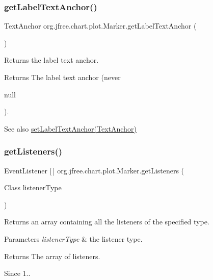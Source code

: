 \subsubsection{\texorpdfstring{get\+Label\+Text\+Anchor()}{getLabelTextAnchor()}}
{\footnotesize\ttfamily Text\+Anchor org.\+jfree.\+chart.\+plot.\+Marker.\+get\+Label\+Text\+Anchor (\begin{DoxyParamCaption}{ }\end{DoxyParamCaption})}

Returns the label text anchor.

\begin{DoxyReturn}{Returns}
The label text anchor (never
\begin{DoxyCode}
null 
\end{DoxyCode}
 ).
\end{DoxyReturn}
\begin{DoxySeeAlso}{See also}
\mbox{\hyperlink{classorg_1_1jfree_1_1chart_1_1plot_1_1_marker_a32c1fda6586338971917109d3a8684cf}{set\+Label\+Text\+Anchor(\+Text\+Anchor)}} 
\end{DoxySeeAlso}
\mbox{\label{classorg_1_1jfree_1_1chart_1_1plot_1_1_marker_a5af157ed82b110dc88e0ef6f5b60f70c}} 
\subsubsection{\texorpdfstring{get\+Listeners()}{getListeners()}}
{\footnotesize\ttfamily Event\+Listener \mbox{[}$\,$\mbox{]} org.\+jfree.\+chart.\+plot.\+Marker.\+get\+Listeners (\begin{DoxyParamCaption}\item[{Class}]{listener\+Type }\end{DoxyParamCaption})}

Returns an array containing all the listeners of the specified type.


\begin{DoxyParams}{Parameters}
{\em listener\+Type} & the listener type.\\
\hline
\end{DoxyParams}
\begin{DoxyReturn}{Returns}
The array of listeners.
\end{DoxyReturn}
\begin{DoxySince}{Since}
1.. 
\end{DoxySince}
\mbox{\label{classorg_1_1jfree_1_1chart_1_1plot_1_1_marker_a36e985c2203c98a8da657b5bd1fd6c67}} 
